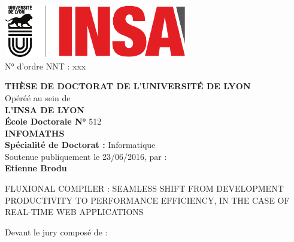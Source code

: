 \begin{center}
\includegraphics[width=8cm]{../resources/logos}%
\\[1em]


{N° d'ordre NNT : xxx \hfill}

\vfill
{
  \fontsize{14pt}{16pt}\selectfont%

  {\large\textbf{\MakeUppercase{Thèse de doctorat de l'université de Lyon}}}\\[1em]

  Opéréé au sein de\\
  {\large\textbf{\MakeUppercase{L'INSA de Lyon}}}\\[1em]

  {\large\textbf{École Doctorale N° }512}\\
  {\large\textbf{\MakeUppercase{InfoMaths}}}\\[1em]

  {\large\textbf{Spécialité de Doctorat : }Informatique}\\[1em]

  Soutenue publiquement le 23/06/2016, par :\\
  {\large\textbf{Etienne Brodu}}\\[1em]
}

\vfill

\parbox{\linewidth}{%
\vspace{10pt}
\titleline%
\vspace{10pt}
\secfont\fontsize{20pt}{25pt}\selectfont%
\MakeUppercase{Fluxional compiler : seamless shift from development productivity to performance efficiency, in the case of real-time web applications}%
\vspace{10pt}%
\titleline\color{black}%
\vspace{10pt}
}

\vfill

Devant le jury composé de : \\[1em]


\end{center}

